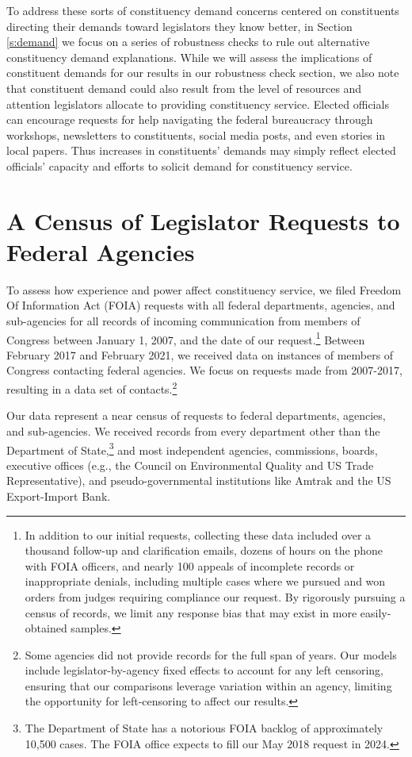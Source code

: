 \documentclass[12pt]{article}
\begin{document}
To address these sorts of constituency demand concerns centered on constituents directing their demands toward legislators they know better, in Section \ref{s:demand} we focus on a series of robustness checks to rule out alternative constituency demand explanations. 
While we will assess the implications of constituent demands for our results in our robustness check section, we also note that constituent demand could also result from the level of resources and attention legislators allocate to providing constituency service. Elected officials can encourage requests for help navigating the federal bureaucracy through workshops, newsletters to constituents, social media posts, and even stories in local papers. Thus increases in constituents' demands may simply reflect elected officials' capacity and efforts to solicit demand for constituency service.

\section{A Census of Legislator Requests to Federal Agencies} \label{s:data}
To assess how experience and power affect constituency service, we filed   Freedom Of Information Act (FOIA) requests with all federal departments, agencies, and sub-agencies for all records of incoming communication from members of Congress between January 1, 2007, and the date of our request.\footnote{In addition to our initial requests, collecting these data included over a thousand follow-up and clarification emails, dozens of hours on the phone with FOIA officers, and nearly 100 appeals of incomplete records or inappropriate denials, including multiple cases where we pursued and won orders from judges requiring compliance our request. By rigorously pursuing a census of records, we limit any response bias that may exist in more easily-obtained samples.} Between February 2017 and February 2021, we received data on  instances of members of Congress contacting federal agencies. We focus on requests made from 2007-2017, resulting in a data set of   contacts.\footnote{Some agencies did not provide records for the full span of years. Our models include legislator-by-agency fixed effects to account for any left censoring, ensuring that our comparisons leverage variation within an agency, limiting the opportunity for left-censoring to affect our results.}  %

Our data represent a near census of requests to federal departments, agencies, and sub-agencies. We received records from every department other than the Department of State,\footnote{The Department of State has a notorious FOIA backlog of approximately 10,500 cases. The FOIA office expects to fill our May 2018 request in 2024.} and most independent agencies, commissions, boards, executive offices (e.g., the Council on Environmental Quality and US Trade Representative), and pseudo-governmental institutions like Amtrak and the US Export-Import Bank. 
\end{document}

